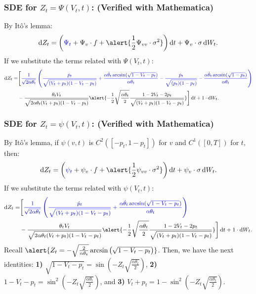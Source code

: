 \documentclass[aspectratio=169]{beamer}\usepackage[utf8]{inputenc}
\begin{document}
\begin{frame}\frametitle{SDE for $Z_t=\Psi(V_t,t)$: ({\color{green}Verified with Mathematica})}

By It\^o's lemma:
\begin{equation*}
\dif Z_t=\left({\color{blue}\Psi_t}+\Psi_v\cdot f+\alert{\frac{1}{2}\Psi_{vv}\cdot\sigma^2}\right)\dif t+\Psi_v\cdot\sigma\dif W_t.
\end{equation*}
If we substitute the terms related with $\Psi(V_t,t)$:
\begin{equation*}
{\footnotesize
\begin{split}
\dif Z_t=&\Bigg[{\color{blue}\frac{1}{\sqrt{2\alpha\theta_t}}\left(\frac{\dot{p}_t}{\sqrt{(V_t+p_t)(1-V_t-p_t)}}+\frac{\alpha\dot{\theta}_t\arcsin(\sqrt{1-V_t-p_t})}{\alpha\theta_t}-\frac{\dot{p}_t}{\sqrt{(p_t)(1-p_t)}}-\frac{\alpha\dot{\theta}_t\arcsin(\sqrt{1-p_t})}{\alpha\theta_t}\right)}\\
&-\frac{\theta_tV_t}{\sqrt{2\alpha\theta_t(V_t+p_t)(1-V_t-p_t)}}\alert{-\frac{1}{2}\sqrt{\frac{\alpha\theta_t}{2}}\frac{1-2V_t-2p_t}{\sqrt{(V_t+p_t)(1-V_t-p_t)}}}\Bigg]\dif t+1\cdot \dif W_t.
\end{split}}
\end{equation*}

\end{frame}


\begin{frame}\frametitle{SDE for $Z_t=\psi(V_t,t)$: ({\color{green}Verified with Mathematica})}

By It\^o's lemma, if $\psi(v,t)$ is $C^2([-p_t,1-p_t])$ for $v$ and $C^1([0,T])$ for $t$, then:
\begin{equation*}
\dif Z_t=\left({\color{blue}\psi_t}+\psi_v\cdot f+\alert{\frac{1}{2}\psi_{vv}\cdot\sigma^2}\right)\dif t+\psi_v\cdot\sigma\dif W_t.
\end{equation*}
If we substitute the terms related with $\psi(V_t,t)$:
\begin{equation*}
{\footnotesize
\begin{split}
\dif Z_t=&\Bigg[{\color{blue}\frac{1}{\sqrt{2\alpha\theta_t}}\left(\frac{\dot{p}_t}{\sqrt{(V_t+p_t)(1-V_t-p_t)}}+\frac{\alpha\dot{\theta}_t\arcsin(\sqrt{1-V_t-p_t})}{\alpha\theta_t}\right)}\\
&-\frac{\theta_tV_t}{\sqrt{2\alpha\theta_t(V_t+p_t)(1-V_t-p_t)}}\alert{-\frac{1}{2}\sqrt{\frac{\alpha\theta_t}{2}}\frac{1-2V_t-2p_t}{\sqrt{(V_t+p_t)(1-V_t-p_t)}}}\Bigg]\dif t+1\cdot \dif W_t.
\end{split}}
\end{equation*}
{\footnotesize
Recall $\alert{Z_t=-\sqrt{\frac{2}{\alpha\theta_t}}\arcsin\left(\sqrt{1-V_t-p_t}\right)}$. Then, we have the next identities: \textbf{1)} $\sqrt{1-V_t-p_t}=\sin\left(-Z_t\sqrt{\frac{\alpha\theta_t}{2}}\right)$, \textbf{2)} $1-V_t-p_t=\sin^2\left(-Z_t\sqrt{\frac{\alpha\theta_t}{2}}\right)$, and \textbf{3)} $V_t+p_t=1-\sin^2\left(-Z_t\sqrt{\frac{\alpha\theta_t}{2}}\right)$.}
\end{frame}
\end{document}
